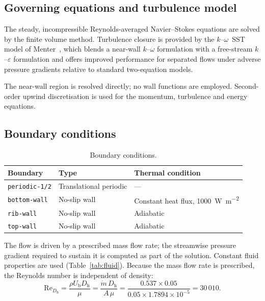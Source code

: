 \documentclass[11pt,a4paper]{article}
\newcommand{\Dh}{D_{\mathrm{h}}}
\newcommand{\Rey}{\mathrm{Re}}
\newcommand{\Ub}{U_{\mathrm{b}}}
\begin{document}
\subsection{Governing equations and turbulence model}

The steady, incompressible Reynolds-averaged Navier--Stokes equations are
solved by the finite volume method. Turbulence closure is provided by the
$k$--$\omega$~SST model of Menter~\cite{menter1994}, which blends a
near-wall $k$--$\omega$ formulation with a free-stream $k$--$\varepsilon$
formulation and offers improved performance for separated flows under
adverse pressure gradients relative to standard two-equation models.

The near-wall region is resolved directly; no wall functions are employed.
Second-order upwind discretisation is used for the momentum, turbulence and
energy equations.

\subsection{Boundary conditions}

\begin{table}[htbp]
\centering
\caption{Boundary conditions.}
\label{tab:bc}
\begin{tabular}{lll}
\toprule
Boundary & Type & Thermal condition \\
\midrule
\texttt{periodic-1/2} & Translational periodic & --- \\
\texttt{bottom-wall}  & No-slip wall & Constant heat flux, \SI{1000}{\watt\per\square\meter} \\
\texttt{rib-wall}     & No-slip wall & Adiabatic \\
\texttt{top-wall}     & No-slip wall & Adiabatic \\
\bottomrule
\end{tabular}
\end{table}

The flow is driven by a prescribed mass flow rate; the streamwise pressure
gradient required to sustain it is computed as part of the solution.
Constant fluid properties are used (Table~\ref{tab:fluid}). Because the mass
flow rate is prescribed, the Reynolds number is independent of density:
\begin{equation}
  \Rey_{\Dh} = \frac{\rho \Ub \Dh}{\mu}
             = \frac{\dot{m}\,\Dh}{A\,\mu}
             = \frac{0.537 \times 0.05}{0.05 \times 1.7894\times10^{-5}}
             = 30\,010 .
\end{equation}
\end{document}
